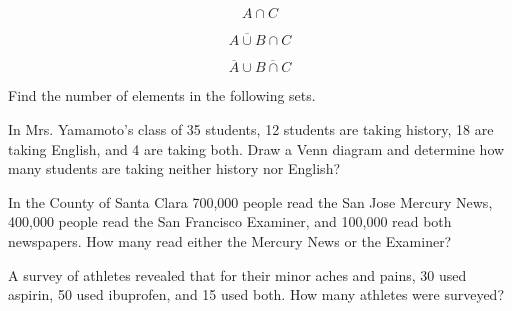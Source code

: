 \begin{puzzle}
    \[A \cap C\]
\end{puzzle}

\begin{puzzle}
    \[\overline{A \cup B} \cap C\]
\end{puzzle}

\begin{puzzle}\label{puzzle_last_AB_set}
    \[\overline{A} \cup \overline{B \cap C}\]
\end{puzzle}

Find the number of elements in the following sets.

\begin{puzzle}
    In Mrs. Yamamoto's class of 35 students, 12 students are taking history, 18 are taking English, and 4 are taking both. Draw a Venn diagram and determine how many students are taking neither history nor English?
\end{puzzle}

\begin{puzzle}
    In the County of Santa Clara 700,000 people read the San Jose Mercury News, 400,000 people read the San Francisco Examiner, and 100,000 read both newspapers. How many read either the Mercury News or the Examiner?
\end{puzzle}

\begin{puzzle}
    A survey of athletes revealed that for their minor aches and pains, 30 used aspirin, 50 used ibuprofen, and 15 used both. How many athletes were surveyed?
\end{puzzle}